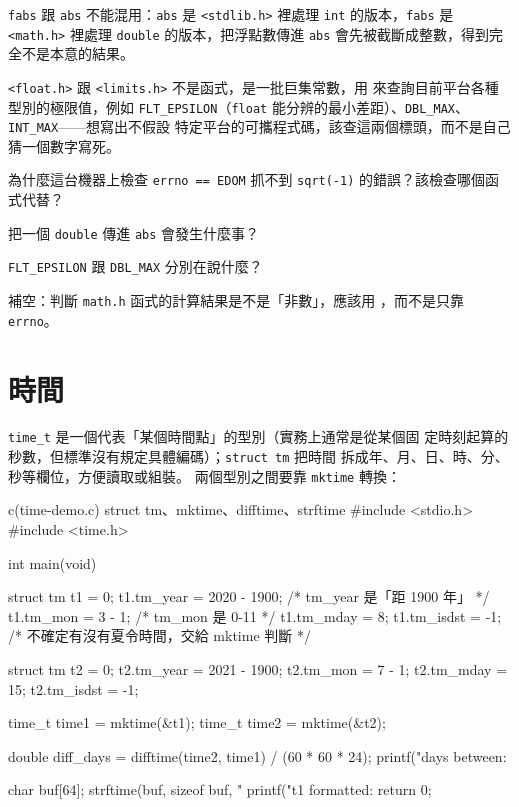 \texttt{fabs} 跟 \texttt{abs} 不能混用：\texttt{abs} 是
\texttt{<stdlib.h>} 裡處理 \texttt{int} 的版本，\texttt{fabs} 是
\texttt{<math.h>} 裡處理 \texttt{double} 的版本，把浮點數傳進
\texttt{abs} 會先被截斷成整數，得到完全不是本意的結果。

\texttt{<float.h>} 跟 \texttt{<limits.h>} 不是函式，是一批巨集常數，用
來查詢目前平台各種型別的極限值，例如 \texttt{FLT\_EPSILON}（\texttt{float}
能分辨的最小差距）、\texttt{DBL\_MAX}、\texttt{INT\_MAX}——想寫出不假設
特定平台的可攜程式碼，該查這兩個標頭，而不是自己猜一個數字寫死。


\begin{drills}[label=drills:sl-math]
\item 為什麼這台機器上檢查 \texttt{errno == EDOM} 抓不到 \texttt{sqrt(-1)}
的錯誤？該檢查哪個函式代替？
\item 把一個 \texttt{double} 傳進 \texttt{abs} 會發生什麼事？
\item \texttt{FLT\_EPSILON} 跟 \texttt{DBL\_MAX} 分別在說什麼？
\item 補空：判斷 \texttt{math.h} 函式的計算結果是不是「非數」，應該用
\underline{\hspace{2em}}，而不是只靠 \texttt{errno}。
\end{drills}

\section{時間}
\label{sec:sl-time}

\texttt{time\_t} 是一個代表「某個時間點」的型別（實務上通常是從某個固
定時刻起算的秒數，但標準沒有規定具體編碼）；\texttt{struct tm} 把時間
拆成年、月、日、時、分、秒等欄位，方便讀取或組裝。 兩個型別之間要靠
\texttt{mktime} 轉換：

\begin{example}{c}{(time-demo.c) struct tm、mktime、difftime、strftime}
#include <stdio.h>
#include <time.h>

int main(void) {
    struct tm t1 = {0};
    t1.tm_year = 2020 - 1900; /* tm_year 是「距 1900 年」 */
    t1.tm_mon = 3 - 1;        /* tm_mon 是 0-11 */
    t1.tm_mday = 8;
    t1.tm_isdst = -1;         /* 不確定有沒有夏令時間，交給 mktime 判斷 */

    struct tm t2 = {0};
    t2.tm_year = 2021 - 1900;
    t2.tm_mon = 7 - 1;
    t2.tm_mday = 15;
    t2.tm_isdst = -1;

    time_t time1 = mktime(&t1);
    time_t time2 = mktime(&t2);

    double diff_days = difftime(time2, time1) / (60 * 60 * 24);
    printf("days between: %

    char buf[64];
    strftime(buf, sizeof buf, "%
    printf("t1 formatted: %
    return 0;
}
\end{example}


